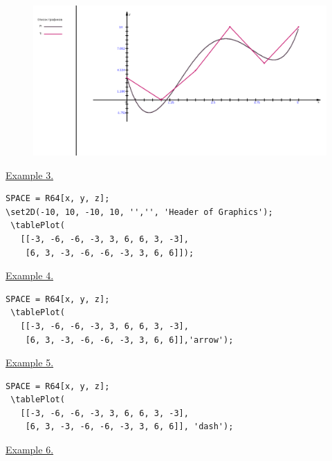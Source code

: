 \begin{figure}[!h]
 \includegraphics[scale=0.25]{pictures/2_8}
\vspace*{-10mm}
\caption{}
\label{2_8}
\end{figure}

\underline{Example 3.}
 
 \vspace*{-2mm}

 \begin{verbatim}
SPACE = R64[x, y, z];
\set2D(-10, 10, -10, 10, '','', 'Header of Graphics');
 \tablePlot(
   [[-3, -6, -6, -3, 3, 6, 6, 3, -3],
    [6, 3, -3, -6, -6, -3, 3, 6, 6]]);
 \end{verbatim}

\underline{Example 4.}
 
 \vspace*{-2mm}

 \begin{verbatim}
SPACE = R64[x, y, z];
 \tablePlot(
   [[-3, -6, -6, -3, 3, 6, 6, 3, -3],
    [6, 3, -3, -6, -6, -3, 3, 6, 6]],'arrow');
 \end{verbatim}

\underline{Example 5.}
 
 \vspace*{-2mm}

 \begin{verbatim}
SPACE = R64[x, y, z];
 \tablePlot(
   [[-3, -6, -6, -3, 3, 6, 6, 3, -3],
    [6, 3, -3, -6, -6, -3, 3, 6, 6]], 'dash');
 \end{verbatim}

\underline{Example 6.}
 
